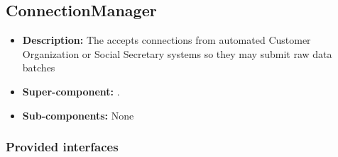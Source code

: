 \subsection{ConnectionManager}
\begin{itemize}
	\item \textbf{Description:} The  accepts connections from automated Customer Organization or Social Secretary systems so they may submit raw data batches
	\item \textbf{Super-component:} .
	\item \textbf{Sub-components:} None
\end{itemize}

\subsubsection*{Provided interfaces}
